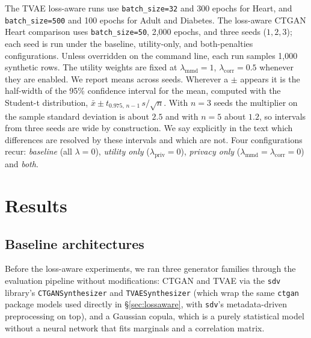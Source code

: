 \documentclass[11pt,a4paper]{article}
\newcommand{\lmmd}{\lambda_{\text{mmd}}}
\newcommand{\lcorr}{\lambda_{\text{corr}}}
\newcommand{\lpriv}{\lambda_{\text{priv}}}
\begin{document}
The TVAE loss-aware runs use \texttt{batch\_size=32} and 300 epochs for Heart,
and \texttt{batch\_size=500} and 100 epochs for Adult and Diabetes. The
loss-aware CTGAN Heart comparison uses \texttt{batch\_size=50}, 2,000 epochs,
and three seeds ($1,2,3$); each seed is run under the baseline, utility-only,
and both-penalties configurations. Unless overridden on the command line,
each run samples 1,000 synthetic rows. The utility weights are fixed at
$\lmmd = 1$, $\lcorr = 0.5$ whenever they are enabled. We report means across
seeds. Wherever a $\pm$ appears it is the half-width of the 95\%
confidence interval for the mean, computed with the Student-t distribution,
$\bar{x} \pm t_{0.975,\,n-1}\, s/\sqrt{n}$. With $n = 3$ seeds the multiplier
on the sample standard deviation is about $2.5$ and with $n = 5$ about $1.2$,
so intervals from three seeds are wide by construction. We say explicitly in
the text which differences are resolved by these intervals and which are not.
Four configurations recur: \emph{baseline} (all $\lambda = 0$),
\emph{utility only} ($\lpriv = 0$), \emph{privacy only}
($\lmmd = \lcorr = 0$) and \emph{both}.

\section{Results}
\label{sec:results}

\subsection{Baseline architectures}
\label{sec:results:baselines}

Before the loss-aware experiments, we ran three generator families through the
evaluation pipeline without modifications: CTGAN and TVAE via the
\texttt{sdv} library's \texttt{CTGANSynthesizer} and \texttt{TVAESynthesizer}
(which wrap the same \texttt{ctgan} package models used directly in
\S\ref{sec:lossaware}, with \texttt{sdv}'s metadata-driven preprocessing on
top), and a Gaussian copula, which is a purely statistical model without a
neural network that fits marginals and a correlation matrix.
\end{document}
